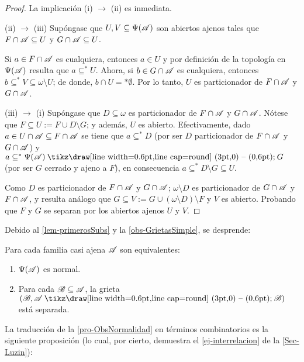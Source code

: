 \begin{proof}
	La implicación (i) $\to$ (ii) es inmediata.

	(ii) $\to$ (iii) Supóngase que $U,V \subseteq \Psi(\mathscr{A})$ son abiertos ajenos tales que $F \cap \mathscr{A} \subseteq U$ y $G \cap \mathscr{A} \subseteq U$.

	Si $a \in F \cap \mathscr{A}$ es cualquiera, entonces $a \in U$ y por definición de la topología en $\Psi(\mathscr{A})$ resulta que $a \subseteq^* U$. Ahora, si $b \in G \cap \mathscr{A}$ es cualquiera, entonces $b \subseteq^* V \subseteq \omega \setminus U$; de donde, $b \cap U =* \emptyset$. Por lo tanto, $U$ es particionador de $F \cap \mathscr{A}$ y $G \cap \mathscr{A}$.

	(iii) $\to$ (i) Supóngase que $D \subseteq \omega$ es particionador de $F \cap \mathscr{A}$ y $G \cap \mathscr{A}$. Nótese que $F \subseteq U:=F \cup D\setminus G$; y además, $U$ es abierto. Efectivamente, dado $a \in U \cap \mathscr{A} \subseteq F \cap \mathscr{A}$ se tiene que $a \subseteq^* D$ (por ser $D$ particionador de $F \cap \mathscr{A}$ y $G \cap \mathscr{A}$) y $a \subseteq^* \Psi(\ms{A}) \setminus G$ (por ser $G$ cerrado y ajeno a $F$), en consecuencia $a \subseteq^* D\setminus G \subseteq U$.

	Como $D$ es particionador de $F \cap \mathscr{A}$ y $G \cap \mathscr{A}$; $\omega \setminus D$ es particionador de $G\cap \mathscr{A}$ y $F \cap \mathscr{A}$, y resulta análogo que $G \subseteq V:=G \cup (\omega \setminus D)\setminus F$ y $V$ es abierto. Probando que $F$ y $G$ se separan por los abiertos ajenos $U$ y $V$.
\end{proof}

Debido al \autoref{lem-primerosSubs} y la \autoref{obs-GrietasSimple}, se desprende:

\begin{corolario}\label{cor-tra-NormalParticionador}
	Para cada familia casi ajena $\mathscr{A}$ son equivalentes:
	\begin{enumerate}
		\item $\Psi(\mathscr{A})$ es normal.
		\item Para cada $\mathscr{B} \subseteq \mathscr{A}$, la grieta $(\ms{B},\ms{A} \setminus \ms{B})$ está separada.
	\end{enumerate}
\end{corolario}

La traducción de la \autoref{pro-ObsNormalidad} en términos combinatorios es la siguiente proposición (lo cual, por cierto, demuestra el \autoref{ej-interrelacion} de la \autoref{Sec-Luzin}):

